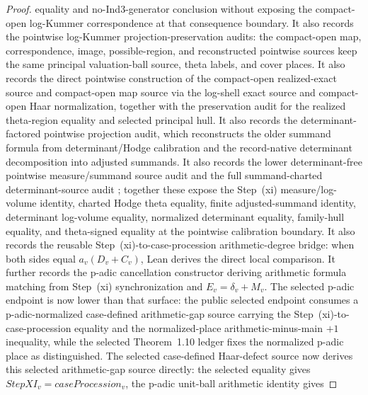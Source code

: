 \begin{proof}
  equality and no-Ind3-generator conclusion without exposing the compact-open
  log-Kummer correspondence at that consequence boundary.  It also records
  the pointwise log-Kummer projection-preservation audits: the compact-open
  map, correspondence, image, possible-region, and reconstructed pointwise
  sources keep the same principal valuation-ball source, theta labels, and
  cover places.  It also records the direct pointwise construction of the
  compact-open realized-exact source and compact-open map source via the
  log-shell exact source and compact-open Haar normalization, together with
  the preservation audit for
  the realized theta-region equality and selected principal hull.  It also records
  the determinant-factored pointwise projection audit, which reconstructs the
  older summand formula from determinant/Hodge calibration and the record-native
  determinant decomposition into adjusted summands.  It also records the lower
  determinant-free pointwise measure/summand source audit
  and the full summand-charted determinant-source audit
  ;
  together these expose the Step~(xi) measure/log-volume identity, charted
  Hodge theta equality, finite adjusted-summand identity, determinant
  log-volume equality, normalized determinant equality, family-hull equality,
  and theta-signed equality at the pointwise calibration boundary.  It also records the
  reusable Step~(xi)-to-case-procession arithmetic-degree bridge: when both
  sides equal \(a_v(D_v+C_v)\), Lean derives the direct local comparison.  It
  further records the p-adic cancellation constructor deriving arithmetic
  formula matching from Step~(xi) synchronization and
  \(E_v=\delta_v+M_v\).  The selected p-adic endpoint is now lower than that
  surface: the public selected endpoint consumes a p-adic-normalized
  case-defined arithmetic-gap source carrying the Step~(xi)-to-case-procession
  equality and the normalized-place arithmetic-minus-main \(+1\) inequality,
  while the selected Theorem~1.10 ledger fixes the normalized p-adic place as
  distinguished.  The selected case-defined Haar-defect source now derives this
  selected arithmetic-gap source directly: the selected equality gives
  \(StepXI_v=caseProcession_v\), the p-adic unit-ball arithmetic identity gives

\end{proof}
